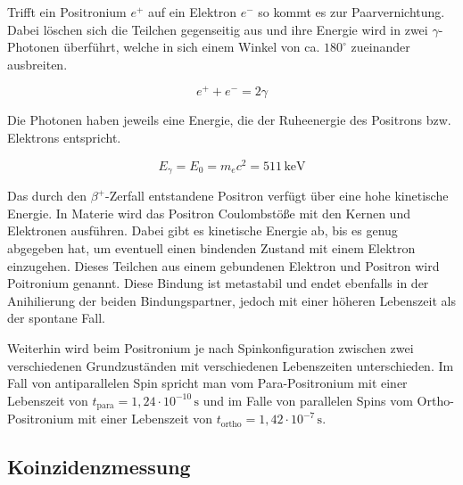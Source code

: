 \documentclass[numbers=noenddot,12pt,a4paper]{scrartcl}
\begin{document}
			Trifft ein Positronium $e^+$ auf ein Elektron $e^-$ so kommt es zur Paarvernichtung. Dabei löschen sich die Teilchen gegenseitig aus und ihre Energie wird in zwei $\gamma$-Photonen überführt, welche in sich einem Winkel von ca. $180^\circ$ zueinander ausbreiten.
	
			\begin{equation}
				e^+ + e^- = 2 \gamma
			\end{equation}
	
			Die Photonen haben jeweils eine Energie, die der Ruheenergie des Positrons bzw. Elektrons entspricht.
			
			\begin{equation}
				E_\gamma = E_0 = m_e c^2 = 511\,\mathrm{keV}
			\end{equation}
	
			Das durch den $\beta^+$-Zerfall entstandene Positron verfügt über eine hohe kinetische Energie. In Materie wird das Positron Coulombstöße mit den Kernen und Elektronen ausführen. Dabei gibt es kinetische Energie ab, bis es genug abgegeben hat, um eventuell einen bindenden Zustand mit einem Elektron einzugehen. Dieses Teilchen aus einem gebundenen Elektron und Positron wird Poitronium genannt. Diese Bindung ist metastabil und endet ebenfalls in der Anihilierung der beiden Bindungspartner, jedoch mit einer höheren Lebenszeit als der spontane Fall.
	
			Weiterhin wird beim Positronium je nach Spinkonfiguration zwischen zwei verschiedenen Grundzuständen mit verschiedenen Lebenszeiten unterschieden. Im Fall von antiparallelen Spin spricht man vom Para-Positronium mit einer Lebenszeit von $t_\mathrm{para} = 1,24\cdot10^{-10}\,\mathrm{s}$ und im Falle von parallelen Spins vom Ortho-Positronium mit einer Lebenszeit von $t_\mathrm{ortho} = 1,42\cdot10^{-7}\,\mathrm{s}$.
	
		\subsection{Koinzidenzmessung}
			
\end{document}

